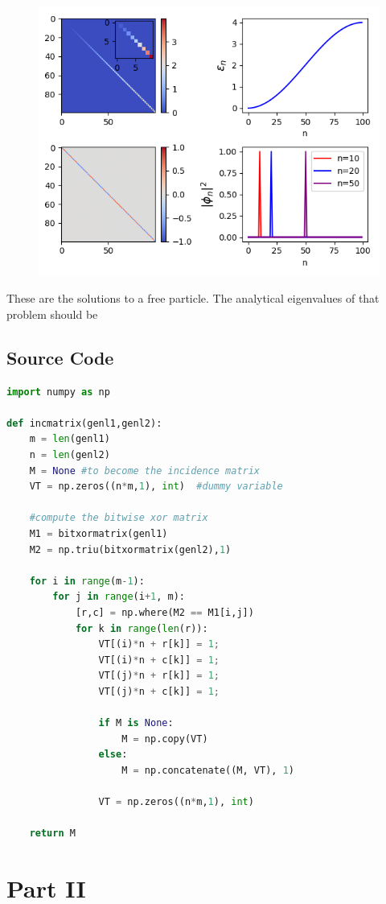 \documentclass[paper=a4, fontsize=11pt]{scrartcl}
\numberwithin{equation}{section}		%
\numberwithin{figure}{section}			%
\numberwithin{table}{section}				%
\begin{document}
\begin{figure}
\includegraphics[width=15cm]{p1_3.png}
\caption{}
\end{figure}


These are the solutions to a free particle. The analytical eigenvalues of that problem should be 



\subsection{Source Code}

\begin{lstlisting}[language=Python]
import numpy as np
    
def incmatrix(genl1,genl2):
    m = len(genl1)
    n = len(genl2)
    M = None #to become the incidence matrix
    VT = np.zeros((n*m,1), int)  #dummy variable
    
    #compute the bitwise xor matrix
    M1 = bitxormatrix(genl1)
    M2 = np.triu(bitxormatrix(genl2),1) 

    for i in range(m-1):
        for j in range(i+1, m):
            [r,c] = np.where(M2 == M1[i,j])
            for k in range(len(r)):
                VT[(i)*n + r[k]] = 1;
                VT[(i)*n + c[k]] = 1;
                VT[(j)*n + r[k]] = 1;
                VT[(j)*n + c[k]] = 1;
                
                if M is None:
                    M = np.copy(VT)
                else:
                    M = np.concatenate((M, VT), 1)
                
                VT = np.zeros((n*m,1), int)
    
    return M
\end{lstlisting}

\section{Part II}
\end{document}
